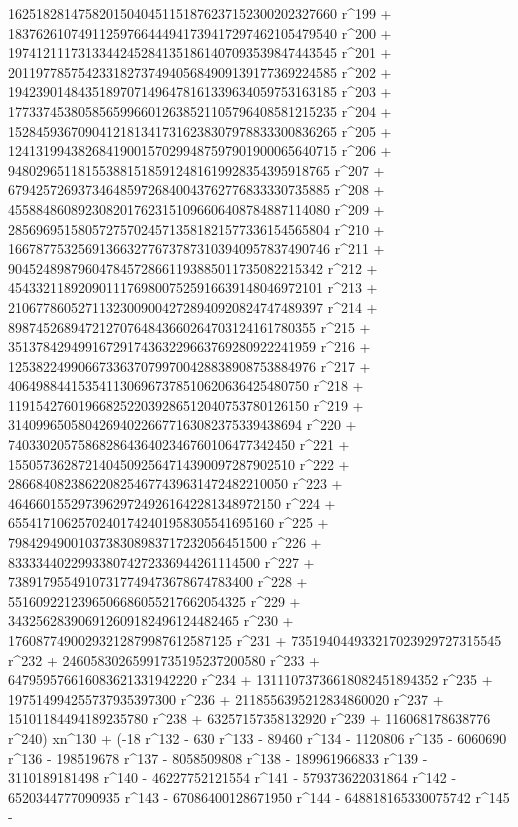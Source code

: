        16251828147582015040451151876237152300202327660 r^199 + 
       18376261074911259766444941739417297462105479540 r^200 + 
       19741211173133442452841351861407093539847443545 r^201 + 
       20119778575423318273749405684909139177369224585 r^202 + 
       19423901484351897071496478161339634059753163185 r^203 + 
       17733745380585659966012638521105796408581215235 r^204 + 
       15284593670904121813417316238307978833300836265 r^205 + 
       12413199438268419001570299487597901900065640715 r^206 + 
       9480296511815538815185912481619928354395918765 r^207 + 
       6794257269373464859726840043762776833330735885 r^208 + 
       4558848608923082017623151096606408784887114080 r^209 + 
       2856969515805727570245713581821577336154565804 r^210 + 
       1667877532569136632776737873103940957837490746 r^211 + 
       904524898796047845728661193885011735082215342 r^212 + 
       454332118920901117698007525916639148046972101 r^213 + 
       210677860527113230090042728940920824747489397 r^214 + 
       89874526894721270764843660264703124161780355 r^215 + 
       35137842949916729174363229663769280922241959 r^216 + 
       12538224990667336370799700428838908753884976 r^217 + 
       4064988441535411306967378510620636425480750 r^218 + 
       1191542760196682522039286512040753780126150 r^219 + 
       314099650580426940226677163082375339438694 r^220 + 
       74033020575868286436402346760106477342450 r^221 + 
       15505736287214045092564714390097287902510 r^222 + 
       2866840823862208254677439631472482210050 r^223 + 
       464660155297396297249261642281348972150 r^224 + 
       65541710625702401742401958305541695160 r^225 + 
       7984294900103738308983717232056451500 r^226 + 
       833334402299338074272336944261114500 r^227 + 
       73891795549107317749473678674783400 r^228 + 
       5516092212396506686055217662054325 r^229 + 
       343256283906912609182496124482465 r^230 + 
       17608774900293212879987612587125 r^231 + 
       735194044933217023929727315545 r^232 + 
       24605830265991735195237200580 r^233 + 
       647959576616083621331942220 r^234 + 
       13111073736618082451894352 r^235 + 
       197514994255737935397300 r^236 + 
       2118556395212834860020 r^237 + 15101184494189235780 r^238 + 
       63257157358132920 r^239 + 
       116068178638776 r^240) xn^130 + (-18 r^132 - 630 r^133 - 
       89460 r^134 - 1120806 r^135 - 6060690 r^136 - 
       198519678 r^137 - 8058509808 r^138 - 189961966833 r^139 - 
       3110189181498 r^140 - 46227752121554 r^141 - 
       579373622031864 r^142 - 6520344777090935 r^143 - 
       67086400128671950 r^144 - 648818165330075742 r^145 - 
